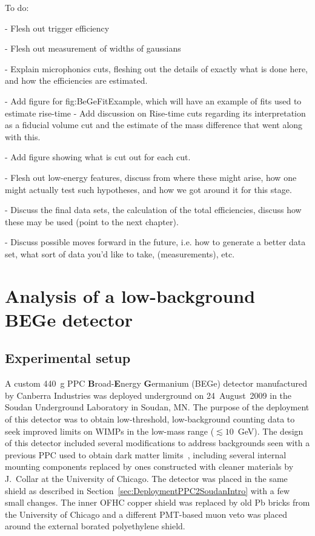 
To do:

- Flesh out trigger efficiency

- Flesh out measurement of widths of gaussians

- Explain microphonics cuts, fleshing out the details of exactly what is done here, and how the efficiencies are estimated.  

- Add figure for fig:BeGeFitExample, which will have an example of fits used to estimate rise-time 
- Add discussion on Rise-time cuts regarding its interpretation as a fiducial volume cut and the estimate of the mass difference that went along with this.

- Add figure showing what is cut out for each cut.

- Flesh out low-energy features, discuss from where these might arise, how one might actually test such hypotheses, and how we got around it for this stage.

- Discuss the final data sets, the calculation of the total efficiencies, discuss how these may be used (point to the next chapter).  
  
- Discuss possible moves forward in the future, i.e. how to generate a better data set, what sort of data you'd like to take, (measurements), etc.  

\chapter{Analysis of a low-background BEGe detector}
\label{chap:AnalysisBeGe}
	\section{Experimental setup}
	\label{sec:BeGeExperimentalSetup}

A custom 440~g PPC \textbf{B}road-\textbf{E}nergy \textbf{G}ermanium (BEGe) detector manufactured by Canberra Industries was deployed underground on 24~August~2009 in the Soudan Underground Laboratory in Soudan, MN.  The purpose of the deployment of this detector was to obtain low-threshold, low-background counting data to seek improved limits on WIMPs in the low-mass range ($\lesssim10$~GeV).  The design of this detector included several modifications to address backgrounds seen with a previous PPC used to obtain dark matter limits~\cite{Aalseth:2008aa}, including several internal mounting components replaced by ones constructed with cleaner materials by J.~Collar at the University of Chicago.  The detector was placed in the same shield as described in Section~\ref{sec:DeploymentPPC2SoudanIntro} with a few small changes.  The inner OFHC copper shield was replaced by old Pb bricks from the University of Chicago and a different PMT-based muon veto was placed around the external borated polyethylene shield.  %

